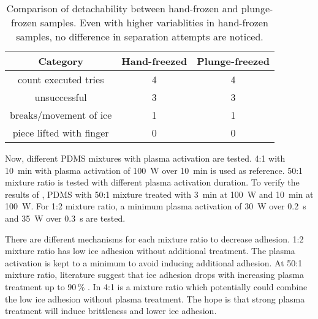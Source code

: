 \begin{table}
	\centering
	\begin{tabular}{|c|c|c|}
		\hline
		Category & Hand-freezed & Plunge-freezed \\
		\hline
		\hline
		count executed tries & 4 & 4\\
		\hline
		unsuccessful & 3 & 3\\
		\hline
		breaks/movement of ice & 1 & 1\\
		\hline
		piece lifted with finger & 0 & 0\\
		\hline		
	\end{tabular}
	\caption{Comparison of detachability between hand-frozen and plunge-frozen samples. Even with higher variablities in hand-frozen samples, no difference in separation attempts are noticed.}
	\label{table:AttemptsHandsvsMachine}
\end{table}

Now, different PDMS mixtures with plasma activation are tested. 4:1 with \SI{10}{\minute} with plasma activation of \SI{100}{\watt} over \SI{10}{\minute} is used as reference. 50:1 mixture ratio is tested with different plasma activation duration. To verify the results of \cite{Ohishi.2017}, PDMS with 50:1 mixture treated with \SI{3}{\minute} at \SI{100}{\watt} and \SI{10}{\minute} at \SI{100}{\watt}. For 1:2 mixture ratio, a minimum plasma activation of \SI{30}{\watt} over \SI{0.2}{\second} and \SI{35}{\watt} over \SI{0.3}{\second} are tested.

There are different mechanisms for each mixture ratio to decrease adhesion. 1:2 mixture ratio has low ice adhesion without additional treatment. The plasma activation is kept to a minimum to avoid inducing additional adhesion. At 50:1 mixture ratio, literature suggest that ice adhesion drops with increasing plasma treatment up to $90\,\%$ \cite{Ohishi.2017}. In 4:1 is a mixture ratio which potentially could combine the low ice adhesion without plasma treatment. The hope is that strong plasma treatment will induce brittleness and lower ice adhesion.


